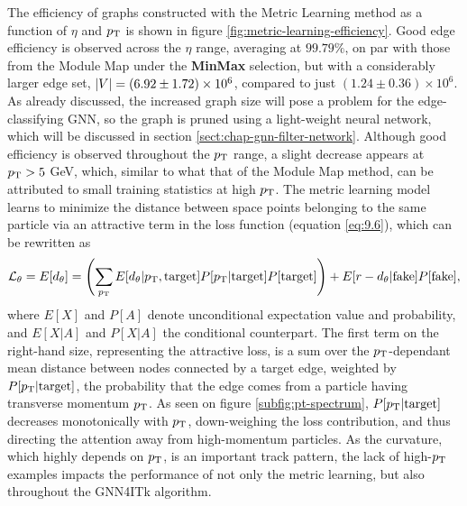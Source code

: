 The efficiency of graphs constructed with the Metric Learning method as a function of $\eta$ and $p_{\text{T}}$ is shown in figure \ref{fig:metric-learning-efficiency}. 
Good edge efficiency is observed across the $\eta$ range, averaging at $99.79\%$, on par with those from the Module Map under the \textbf{MinMax} selection, but with a considerably larger edge set, $\abs{V} = (6.92\pm 1.72)\times 10^6$, compared to just $(1.24\pm 0.36)\times 10^6$. 
As already discussed, the increased graph size will pose a problem for the edge-classifying GNN, so the graph is pruned using a light-weight neural network, which will be discussed in section \ref{sect:chap-gnn-filter-network}.
Although good efficiency is observed throughout the $p_{\text{T}}$ range, a slight decrease appears at $p_{\text{T}}>5$ GeV, which, similar to what that of the Module Map method, can be attributed to small training statistics at high $p_{\text{T}}$.
The metric learning model learns to minimize the distance between space points belonging to the same particle via an attractive term in the loss function (equation \eqref{eq:9.6}), which can be rewritten as
\begin{equation}
    \label{eq:9.8}
\mathcal{L}_{\theta} = E[d_\theta] =   \left( \sum_{p_{\text{T}}} E[d_{\theta} | p_{\text{T}}, \mathrm{target}] P[p_{\text{T}}|\mathrm{target}] P[\mathrm{target}] \right)  +  E[r-d_{\theta}|\mathrm{fake}] P[\mathrm{fake}],
\end{equation}
where $E[X]$ and $P[A]$ denote unconditional expectation value and probability, and $E[X|A]$ and $P[X|A]$ the conditional counterpart. 
The first term on the right-hand size, representing the attractive loss, is a sum over the $p_{\text{T}}$-dependant mean distance between nodes connected by a target edge, weighted by $P[p_{\text{T}}|\mathrm{target}]$, the probability that the edge comes from a particle having transverse momentum $p_{\text{T}}$.
As seen on figure \ref{subfig:pt-spectrum}, $P[p_{\text{T}}|\mathrm{target}]$ decreases monotonically with $p_{\text{T}}$, down-weighing the loss contribution, and thus directing the attention away from high-momentum particles.
As the curvature, which highly depends on $p_{\text{T}}$, is an important track pattern, the lack of high-$p_{\text{T}}$ examples impacts the performance of not only the metric learning, but also throughout the GNN4ITk algorithm.

